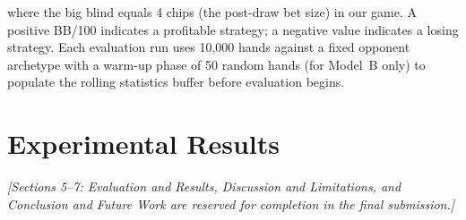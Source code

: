 \documentclass[conference]{IEEEtran}
\begin{document}
where the big blind equals 4 chips (the post-draw bet size) in
our game. A positive BB/100 indicates a profitable strategy; a
negative value indicates a losing strategy. Each evaluation run
uses 10{,}000 hands against a fixed opponent archetype with a warm-up
phase of 50 random hands (for Model~B only) to populate the rolling
statistics buffer before evaluation begins.

\section{Experimental Results}
\label{sec:results}
\textit{[Sections 5--7: Evaluation and Results, Discussion and
Limitations, and Conclusion and Future Work are reserved for
completion in the final submission.]}



\end{document}
